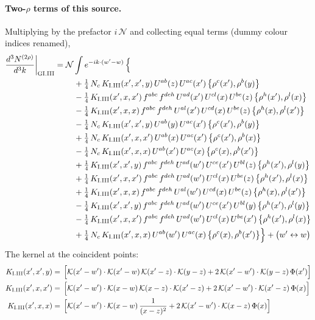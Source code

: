 \documentclass[10pt]{article}
\numberwithin{equation}{section}
\newcommand{\KK}{\mathcal K}
\newcommand{\NN}{\mathcal N}
\begin{document}
\paragraph{Two-$\rho$ terms of this source.} Multiplying by the prefactor $i\,\NN$ and collecting equal terms (dummy colour indices renamed),
\begin{align}
\frac{d^3N^{(2\rho)}}{d^3k}\bigg|_{\rm GI.III}={}&\NN\int e^{-ik\cdot(w'-w)}\,\Big\{\notag\\
&\quad +\tfrac14\,N_{c}\,K_{\rm I.III}(x',x',y)\,U^{ab}(z)\,U^{ac}(x')\,\big\{\rho^{c}(x'),\rho^{b}(y)\big\}\notag\\
&\quad -\tfrac14\,K_{\rm I.III}(x',x,x')\,f^{abc}\,f^{deh}\,U^{ad}(x')\,U^{cl}(x)\,U^{be}(z)\,\big\{\rho^{h}(x'),\rho^{l}(x)\big\}\notag\\
&\quad -\tfrac14\,K_{\rm I.III}(x',x,x)\,f^{abc}\,f^{deh}\,U^{al}(x')\,U^{cd}(x)\,U^{be}(z)\,\big\{\rho^{h}(x),\rho^{l}(x')\big\}\notag\\
&\quad -\tfrac14\,N_{c}\,K_{\rm I.III}(x',x',y)\,U^{ab}(y)\,U^{ac}(x')\,\big\{\rho^{c}(x'),\rho^{b}(y)\big\}\notag\\
&\quad +\tfrac14\,N_{c}\,K_{\rm I.III}(x',x,x')\,U^{ab}(x)\,U^{ac}(x')\,\big\{\rho^{c}(x'),\rho^{b}(x)\big\}\notag\\
&\quad -\tfrac14\,N_{c}\,K_{\rm I.III}(x',x,x)\,U^{ab}(x')\,U^{ac}(x)\,\big\{\rho^{c}(x),\rho^{b}(x')\big\}\notag\\
&\quad +\tfrac14\,K_{\rm I.III}(x',x',y)\,f^{abc}\,f^{deh}\,U^{ad}(w')\,U^{ce}(x')\,U^{bl}(z)\,\big\{\rho^{h}(x'),\rho^{l}(y)\big\}\notag\\
&\quad +\tfrac14\,K_{\rm I.III}(x',x,x')\,f^{abc}\,f^{deh}\,U^{ad}(w')\,U^{cl}(x)\,U^{be}(z)\,\big\{\rho^{h}(x'),\rho^{l}(x)\big\}\notag\\
&\quad +\tfrac14\,K_{\rm I.III}(x',x,x)\,f^{abc}\,f^{deh}\,U^{al}(w')\,U^{cd}(x)\,U^{be}(z)\,\big\{\rho^{h}(x),\rho^{l}(x')\big\}\notag\\
&\quad -\tfrac14\,K_{\rm I.III}(x',x',y)\,f^{abc}\,f^{deh}\,U^{ad}(w')\,U^{ce}(x')\,U^{bl}(y)\,\big\{\rho^{h}(x'),\rho^{l}(y)\big\}\notag\\
&\quad -\tfrac14\,K_{\rm I.III}(x',x,x')\,f^{abc}\,f^{deh}\,U^{ad}(w')\,U^{cl}(x)\,U^{be}(x')\,\big\{\rho^{h}(x'),\rho^{l}(x)\big\}\notag\\
&\quad +\tfrac14\,N_{c}\,K_{\rm I.III}(x',x,x)\,U^{ab}(w')\,U^{ac}(x)\,\big\{\rho^{c}(x),\rho^{b}(x')\big\}\Big\}+\big(w'\leftrightarrow w\big)\label{R:eq:res-GI.III}
\end{align}
The kernel at the coincident points:
\begin{align*}
K_{\rm I.III}(x',x',y)&=\,\Big[\KK(x'-w')\cdot\KK(x'-w)\,\KK(x'-z)\cdot\KK(y-z)+2\,\KK(x'-w')\cdot\KK(y-z)\,\Phi(x')\Big]\\K_{\rm I.III}(x',x,x')&=\,\Big[\KK(x'-w')\cdot\KK(x-w)\,\KK(x-z)\cdot\KK(x'-z)+2\,\KK(x'-w')\cdot\KK(x'-z)\,\Phi(x)\Big]\\K_{\rm I.III}(x',x,x)&=\,\Big[\KK(x'-w')\cdot\KK(x-w)\,\frac{1}{(x-z)^2}+2\,\KK(x'-w')\cdot\KK(x-z)\,\Phi(x)\Big]
\end{align*}
\end{document}
